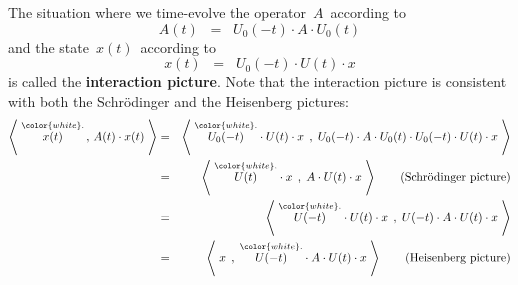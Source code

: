 The situation where we time-evolve the operator \,$A$\, according to
\begin{equation*}
A(t) \;\; = \;\; U_{0}(-t) \cdot A \cdot U_{0}(t)
\end{equation*}
and the state \,$x(t)$\, according to
\begin{equation*}
x(t) \;\; = \;\; U_{0}(-t) \cdot U(t) \cdot x
\end{equation*}
is called the \textbf{interaction picture}.
Note that the interaction picture is consistent with both the Schr\"odinger and the Heisenberg pictures:
\begin{eqnarray*}
\left\langle\; \overset{{\color{white}.}}{x(t)} \,,\, A(t) \cdot x(t) \;\right\rangle
& = &
	\left\langle\;
		\overset{{\color{white}.}}{U_{0}(-t)} \cdot U(t) \cdot x
		\;\,,\;
		U_{0}(-t) \cdot A \cdot U_{0}(t) \cdot U_{0}(-t) \cdot U(t) \cdot x
		\;\right\rangle
\\
& = &
	\left\langle\;
		\overset{{\color{white}.}}{U(t)} \cdot x
		\;\,,\;
		A \cdot U(t) \cdot x
		\;\right\rangle
	\quad\quad
	\textnormal{(Schr\"odinger picture)}
\\
& = &
	\left\langle\;
		\overset{{\color{white}.}}{U(-t)} \cdot U(t) \cdot x
		\;\,,\;
		U(-t) \cdot A \cdot U(t) \cdot x
		\;\right\rangle
\\
& = &
	\left\langle\;
		x
		\;\,,\;
		\overset{{\color{white}.}}{U(-t)} \cdot A \cdot U(t) \cdot x
		\;\right\rangle
	\quad\quad
	\textnormal{(Heisenberg picture)}
\end{eqnarray*}


\vskip 0.5cm
